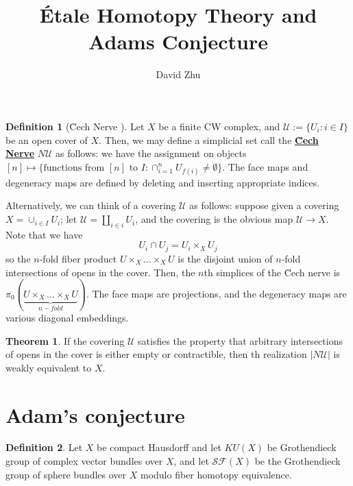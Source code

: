 \documentclass{article}
\title{\'Etale Homotopy Theory and Adams Conjecture}
\author{David Zhu}
\theoremstyle{definition}
\newtheorem{theorem}{Theorem}[section]
\theoremstyle{definition}
\newtheorem{definition}{Definition}[theorem]
\theoremstyle{definition}
\theoremstyle{definition}
\theoremstyle{definition}
\theoremstyle{definition}
\theoremstyle{definition}
\begin{document}
\maketitle



\begin{tcolorbox}[colback=purple!5!white,colframe=purple!75!black]
\begin{definition}[\u Cech Nerve ]
Let $X$ be a finite CW complex, and $\mathcal{U}:=\{U_i: i\in I\}$ be an open cover of $X$. Then, we may define a simplicial set call the \underline{\textbf{\u Cech Nerve}} $N \mathcal{U}$ as follows: we have the assignment on objects $[n]\mapsto \{\textrm{functions from }[n] \textrm{ to } I: \cap^n_{i=1}U_{f(i)}\neq \emptyset \}$. The face maps and degeneracy maps are defined by deleting and inserting appropriate indices. 
\end{definition}
\end{tcolorbox}

Alternatively, we can think of a covering $\mathcal{U}$ as follows: suppose given a covering $X=\cup_{i\in I}U_i$; let $\mathcal{U}=\coprod_{i\in i} U_i$, and the covering is the obvious map $\mathcal{U}\to X$. Note that we have 
\[U_i\cap U_j=U_i\times_X U_j\]
so the $n$-fold fiber product $U\times_X...\times_X U$ is the disjoint union of $n$-fold intersections of opens in the cover. Then, the $n$th simplices of the \u Cech nerve is $\pi_0(  \underbrace{U\times_X...\times_X U }_{n-fold})$. The face maps are projections, and the degeneracy maps are various diagonal embeddings.


\begin{tcolorbox}[colback=red!5!white,colframe=red!30!white]
\begin{theorem}
If the covering $\mathcal{U}$ satisfies the property that arbitrary intersections of opens in the cover is either empty or contractible, then th realization $|N \mathcal{U}|$ is weakly equivalent to $X$.
\end{theorem}
\end{tcolorbox}


\section{Adam's conjecture}


\begin{tcolorbox}[colback=purple!5!white,colframe=purple!75!black]
\begin{definition}
Let $X$ be compact Hausdorff and let $KU(X)$ be Grothendieck group of complex vector bundles over $X$, and let $\mathcal{SF}(X)$ be the Grothendieck group of sphere bundles over $X$ modulo fiber homotopy equivalence. 
\end{definition}
\end{tcolorbox}
\end{document}
